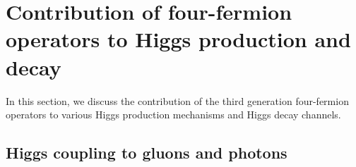 %
\section{Contribution of four-fermion operators to Higgs production and decay \label{sec:Higgs}}
In this section, we discuss the contribution of the third generation four-fermion operators to various Higgs production mechanisms  and  Higgs decay channels.


\subsection{Higgs coupling to gluons and photons}

